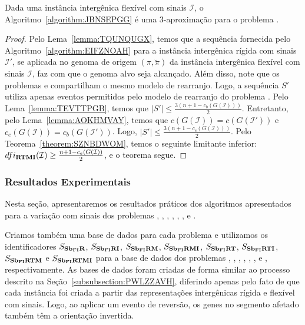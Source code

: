 \begin{theorem}\label{theorem:AKZNNSGT}
Dada uma instância intergênica flexível com sinais $\mathcal{I}$, o Algoritmo~\ref{algorithm:JBNSEPGG} é uma $3$-aproximação para o problema \SbFIRTMI{}.
\end{theorem}
\begin{proof}
Pelo Lema~\ref{lemma:TQUNQUGX}, temos que a sequência fornecida pelo Algoritmo~\ref{algorithm:EIFZNOAH} para a instância intergênica rígida com sinais $\mathcal{I'}$, se aplicada no genoma de origem $(\pi,\breve\pi)$ da instância intergênica flexível com sinais $\mathcal{I}$, faz com que o genoma alvo seja alcançado. Além disso, note que os problemas \SbIRTMI{} e \SbFIRTMI{} compartilham o mesmo modelo de rearranjo. Logo, a sequência $S'$ utiliza apenas eventos permitidos pelo modelo de rearranjo do problema \SbFIRTMI{}. Pelo Lema~\ref{lemma:TEVTTPGB}, temos que $|S'| \le \frac{3(n+1 - c_b(G(\mathcal{I})))}{2}$. Entretanto, pelo Lema~\ref{lemma:AOKHMVAY}, temos que $c(G(\mathcal{I})) = c(G(\mathcal{I}'))$ e $c_e(G(\mathcal{I})) = c_b(G(\mathcal{I}'))$. Logo, $|S'| \le \frac{3(n+1 - c_e(G(\mathcal{I})))}{2}$. Pelo Teorema~\ref{theorem:SZNBDWOM}, temos o seguinte limitante inferior: $dfi_{\textbf{RTMI}}(\mathcal{I}) \ge \frac{n+1 - c_e(G(\mathcal{I}))}{2}$, e o teorema segue.
\end{proof}

\subsubsection{Resultados Experimentais}

Nesta seção, apresentaremos os resultados práticos dos algoritmos apresentados para a variação com sinais dos problemas \SbFIR{}, \SbFIRI{}, \SbFIRM{}, \SbFIRMI{}, \SbFIRT{}, \SbFIRTI{}, \SbFIRTM{} e \SbFIRTMI{}.

Criamos também uma base de dados para cada problema e utilizamos os identificadores $S_{\textbf{Sb\textsubscript{FI}R}}{}$, $S_{\textbf{Sb\textsubscript{FI}RI}}{}$, $S_{\textbf{Sb\textsubscript{FI}RM}}{}$, $S_{\textbf{Sb\textsubscript{FI}RMI}}{}$, $S_{\textbf{Sb\textsubscript{FI}RT}}{}$, $S_{\textbf{Sb\textsubscript{FI}RTI}}{}$, $S_{\textbf{Sb\textsubscript{FI}RTM}}{}$ e $S_{\textbf{Sb\textsubscript{FI}RTMI}}{}$ para a base de dados dos problemas \SbFIR{}, \SbFIRI{}, \SbFIRM{}, \SbFIRMI{}, \SbFIRT{}, \SbFIRTI{}, \SbFIRTM{} e \SbFIRTMI{}, respectivamente. As bases de dados foram criadas de forma similar ao processo descrito na Seção~\ref{subsubsection:PWLZZAVH}, diferindo apenas pelo fato de que cada instância foi criada a partir das representações intergênicas rígida e flexível com sinais. Logo, ao aplicar um evento de reversão, os genes no segmento afetado também têm a orientação invertida.

